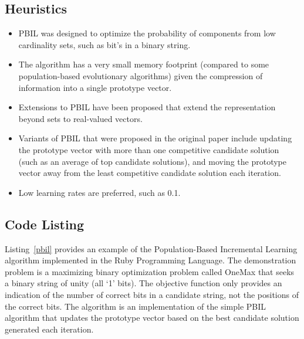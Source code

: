 \subsection{Heuristics}
\begin{itemize}
	\item PBIL was designed to optimize the probability of components from low cardinality sets, such as bit's in a binary string.
	\item The algorithm has a very small memory footprint (compared to some population-based evolutionary algorithms) given the compression of information into a single prototype vector.
	\item Extensions to PBIL have been proposed that extend the representation beyond sets to real-valued vectors.
	\item Variants of PBIL that were proposed in the original paper include updating the prototype vector with more than one competitive candidate solution (such as an average of top candidate solutions), and moving the prototype vector away from the least competitive candidate solution each iteration.
	\item Low learning rates are preferred, such as 0.1.
\end{itemize}

\subsection{Code Listing}
Listing~\ref{pbil} provides an example of the Population-Based Incremental Learning algorithm implemented in the Ruby Programming Language. 
The demonstration problem is a maximizing binary optimization problem called OneMax that seeks a binary string of unity (all `1' bits). The objective function only provides an indication of the number of correct bits in a candidate string, not the positions of the correct bits.
The algorithm is an implementation of the simple PBIL algorithm that updates the prototype vector based on the best candidate solution generated each iteration. 

